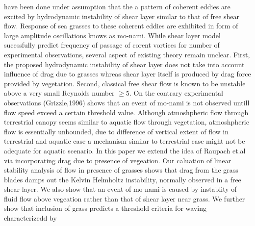 \documentclass[aps,preprint,floatfix,prl]{revtex4-1}
\begin{document}
have been done under assumption that the a pattern of coherent eddies are excited by hydrodynamic instability of shear layer
similar to that of free shear flow. Response of sea grasses to these coherent eddies are exhibited in form of large amplitude oscillations knows as mo-nami. While shear layer
model sucessfully predict frequency of passage of corent vortices for number of experimental observations,
several aspect of existing theory remain unclear. First, the proposed hydrodynamic instability of shear layer does not take into account influence of
drag due to grasses whreas shear layer itself is produced by drag force provided by vegetation. 
Second, classical free shear flow is known to be unstable above a very small Reynolds number $\geq 5 $. On the contrary experimental observations
(Grizzle,1996) shows that an event of mo-nami is not observed untill flow speed exceed a certain threshold value. Although atmoshpheric flow through terrestrial canopy seems similar to 
aquatic flow through vegetation, atmoshpheric flow is essentially unbounded, due to difference of vertical extent of flow in terrestrial and aquatic case a mechanism similar to 
terrestrial case might not be adequate for aquatic scenario.
\newline 
 In this paper we extend the idea of Raupach et.al via incorporating drag due to presence of vegeation. Our caluation of linear stability analysis of flow in presence of grasses 
shows that drag from the grass blades damps out the Kelvin Helmholtz instability, normally observed in a free shear layer. We also show that an event of mo-nami is caused by instablity 
of fluid flow above vegeation rather than that of shear layer near grass. We further show that inclusion of grass predicts a threshold criteria for waving characterizedd by
\end{document}
